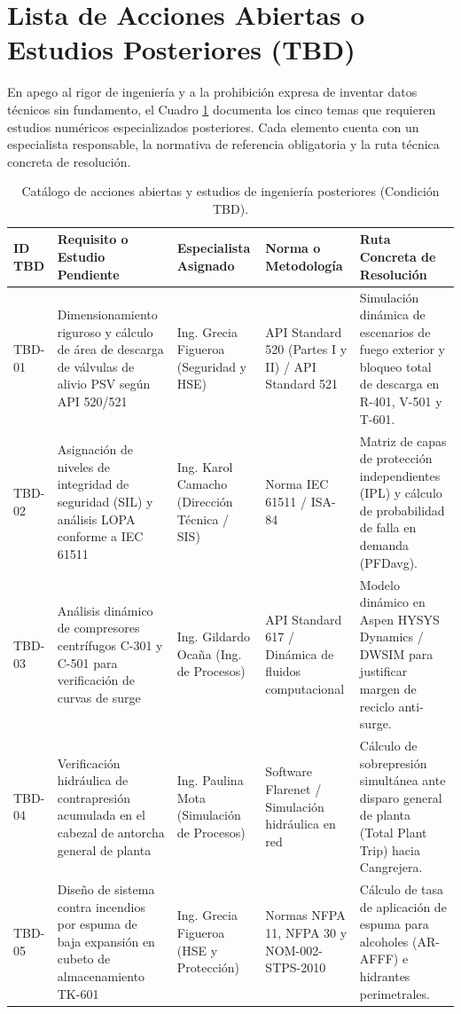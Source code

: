 \documentclass[10pt,letterpaper]{article}
\begin{document}
\section{Lista de Acciones Abiertas o Estudios Posteriores (TBD)}
En apego al rigor de ingeniería y a la prohibición expresa de inventar datos técnicos sin fundamento, el Cuadro \ref{tab:tbd_tabla} documenta los cinco temas que requieren estudios numéricos especializados posteriores. Cada elemento cuenta con un especialista responsable, la normativa de referencia obligatoria y la ruta técnica concreta de resolución.

\begin{table}[H]
\centering\small
\caption{Catálogo de acciones abiertas y estudios de ingeniería posteriores (Condición TBD).} \label{tab:tbd_tabla}
\begin{tabularx}{\textwidth}{|l|p{4.0cm}|p{3.0cm}|p{3.2cm}|X|}
\hline
\rowcolor{tableheader}\color{white}\textbf{ID TBD} & \color{white}\textbf{Requisito o Estudio Pendiente} & \color{white}\textbf{Especialista Asignado} & \color{white}\textbf{Norma o Metodología} & \color{white}\textbf{Ruta Concreta de Resolución} \\ \hline
TBD-01 & Dimensionamiento riguroso y cálculo de área de descarga de válvulas de alivio PSV según API 520/521 & Ing. Grecia Figueroa (Seguridad y HSE) & API Standard 520 (Partes I y II) / API Standard 521 & Simulación dinámica de escenarios de fuego exterior y bloqueo total de descarga en R-401, V-501 y T-601. \\ \hline
TBD-02 & Asignación de niveles de integridad de seguridad (SIL) y análisis LOPA conforme a IEC 61511 & Ing. Karol Camacho (Dirección Técnica / SIS) & Norma IEC 61511 / ISA-84 & Matriz de capas de protección independientes (IPL) y cálculo de probabilidad de falla en demanda (PFDavg). \\ \hline
TBD-03 & Análisis dinámico de compresores centrífugos C-301 y C-501 para verificación de curvas de surge & Ing. Gildardo Ocaña (Ing. de Procesos) & API Standard 617 / Dinámica de fluidos computacional & Modelo dinámico en Aspen HYSYS Dynamics / DWSIM para justificar margen de reciclo anti-surge. \\ \hline
TBD-04 & Verificación hidráulica de contrapresión acumulada en el cabezal de antorcha general de planta & Ing. Paulina Mota (Simulación de Procesos) & Software Flarenet / Simulación hidráulica en red & Cálculo de sobrepresión simultánea ante disparo general de planta (Total Plant Trip) hacia Cangrejera. \\ \hline
TBD-05 & Diseño de sistema contra incendios por espuma de baja expansión en cubeto de almacenamiento TK-601 & Ing. Grecia Figueroa (HSE y Protección) & Normas NFPA 11, NFPA 30 y NOM-002-STPS-2010 & Cálculo de tasa de aplicación de espuma para alcoholes (AR-AFFF) e hidrantes perimetrales. \\ \hline
\end{tabularx}
\end{table}
\newpage
\end{document}
